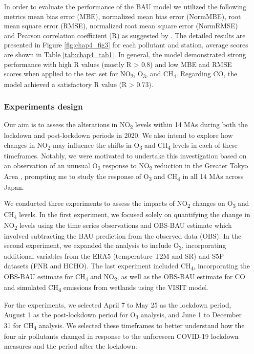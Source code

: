 In order to evaluate the performance of the BAU model we utilized the following metrics mean bias error (MBE), normalized mean bias error (NormMBE), root mean square error (RMSE), normalized root mean square error (NormRMSE) and Pearson correlation coefficient (R) as suggested by \citep{grange2021covid}. The detailed results are presented in Figure \ref{fig:chap4_fig3} for each pollutant and station, average scores are shown in Table \ref{tab:chap4_tab1}. In general, the model demonstrated strong performance with high R values (mostly R > 0.8) and low MBE and RMSE scores when applied to the test set for NO\textsubscript{2}, O\textsubscript{3}, and CH\textsubscript{4}. Regarding CO, the model achieved a satisfactory R value (R > 0.73).\par

\subsubsection{Experiments design}
Our aim is to assess the alterations in NO\textsubscript{2} levels within 14 MAs during both the lockdown and post-lockdown periods in 2020. We also intend to explore how changes in NO\textsubscript{2} may influence the shifts in O\textsubscript{3} and CH\textsubscript{4} levels in each of these timeframes. Notably, we were motivated to undertake this investigation based on an observation of an unusual O\textsubscript{3} response to NO\textsubscript{2} reduction in the Greater Tokyo Area \citep{damiani2022peculiar}, prompting me to study the response of O\textsubscript{3} and CH\textsubscript{4} in all 14 MAs across Japan. \par
We conducted three experiments to assess the impacts of NO\textsubscript{2} changes on O\textsubscript{3} and CH\textsubscript{4} levels. In the first experiment, we focused solely on quantifying the change in NO\textsubscript{2} levels using the time series observations and OBS-BAU estimate which involved subtracting the BAU prediction from the observed data (OBS). In the second experiment, we expanded the analysis to include O\textsubscript{3}, incorporating additional variables from the ERA5 (temperature \textminus T2M and SR) and S5P datasets (FNR and HCHO). The last experiment included CH\textsubscript{4}, incorporating the OBS-BAU estimate for CH\textsubscript{4} and NO\textsubscript{2}, as well as the OBS-BAU estimate for CO and simulated CH\textsubscript{4} emissions from wetlands using the VISIT model. \par
For the experiments, we selected April 7 to May 25 as the lockdown period, August 1 as the post-lockdown period for O\textsubscript{3} analysis, and June 1 to December 31 for CH\textsubscript{4} analysis. We selected these timeframes to better understand how the four air pollutants changed in response to the unforeseen COVID-19 lockdown measures and the period after the lockdown. \par

